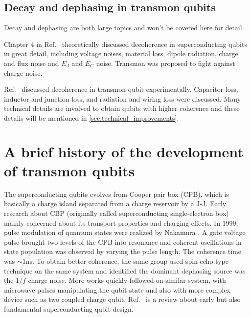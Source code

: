        

    \subsection{Decay and dephasing in transmon qubits} %
    \label{sub:decay_and_dephasing_in_transmon_qubits}

    Decay and dephasing are both large topics and won't be covered here for detail.

    Chapter 4 in Ref.~ theoretically discussed decoherence in superconducting qubits in great detail, including voltage noises, material loss, dipole radiation, charge and flux noise and $E_J$ and $E_C$ noise. Transmon was proposed to fight against charge noise.

    Ref.~ discussed decoherence in transmon qubit experimentally. Capacitor loss, inductor and junction loss, and radiation and wiring loss were discussed. Many technical details are involved to obtain qubits with higher coherence and these details will be mentioned in \ref{sec:technical_improvements}.
    
    



\section{A brief history of the development of transmon qubits} %
\label{sec:history_of_the_development_of_transmon_qubit}

The superconducting qubits evolves from Cooper pair box (CPB), which is basically a charge island separated from a charge reservoir by a J-J. Early research about CBP (originally called superconducting single-electron box\cite{Nakamura1997}) mainly concerned about its transport properties and charging effects. In 1999, pulse modulation of quantum states were realized by Nakamura \etal\cite{Nakamura1999}. A gate voltage pulse brought two levels of the CPB into resonance and coherent oscillations in state population was observed by varying the pulse length. The coherence time was $\sim 1$ns. To obtain better coherence, the same group used spin-echo-type technique on the same system and identified the dominant dephasing source was the $1/f$ charge noise\cite{Nakamura2002}. More works quickly followed on similar system, with microwave pulses manipulating the qubit state\cite{Vion2002,Collin2004} and also with more complex device such as two coupled charge qubit\cite{Pashkin2003}. Ref.~ is a review about early but also fundamental superconducting qubit design.


